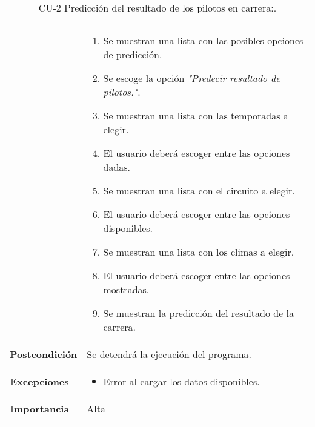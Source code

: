 \begin{longtable}[h!]{@{}ll@{}}
\begin{minipage}[t]{0.23\columnwidth}
\end{minipage} & \begin{minipage}[t]{0.71\columnwidth}\raggedright\strut
\begin{enumerate}
\def\labelenumi{\arabic{enumi}.}
\tightlist
\item
  Se muestran una lista con las posibles opciones de predicción.
\item
  Se escoge la opción \textit{"Predecir resultado de pilotos."}.
\item
  Se muestran una lista con las temporadas a elegir.
\item
  El usuario deberá escoger entre las opciones dadas.
\item
  Se muestran una lista con el circuito a elegir.
\item
  El usuario deberá escoger entre las opciones disponibles.
\item
  Se muestran una lista con los climas a elegir.
\item
  El usuario deberá escoger entre las opciones mostradas.
\item
  Se muestran la predicción del resultado de la carrera.
\end{enumerate}\strut
\end{minipage}\tabularnewline
\begin{minipage}[t]{0.23\columnwidth}\raggedright\strut
\textbf{Postcondición}\strut
\end{minipage} & \begin{minipage}[t]{0.71\columnwidth}\raggedright\strut
Se detendrá la ejecución del programa.\strut
\end{minipage}\tabularnewline
\begin{minipage}[t]{0.23\columnwidth}\raggedright\strut
\textbf{Excepciones}\strut
\end{minipage} & \begin{minipage}[t]{0.71\columnwidth}\raggedright\strut
\begin{itemize}
\tightlist
\item
  Error al cargar los datos disponibles.
\end{itemize}\strut
\end{minipage}\tabularnewline
\begin{minipage}[t]{0.23\columnwidth}\raggedright\strut
\textbf{Importancia}\strut
\end{minipage} & \begin{minipage}[t]{0.71\columnwidth}\raggedright\strut
Alta\strut
\end{minipage}\tabularnewline
\bottomrule
\caption{CU-2 Predicción del resultado de los pilotos en carrera:.}
\end{longtable}

